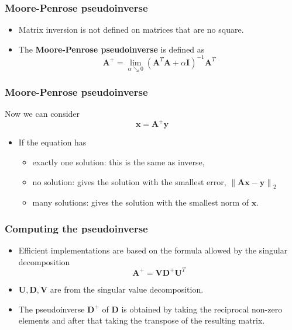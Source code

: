 \documentclass[notes]{beamer}          %
\newcommand{\vect}[1]{\bm{#1}}
\newcommand{\norm}[1]{\left\lVert#1\right\rVert}
\newcommand{\norm}[1]{\lVert#1\rVert}
\begin{document}
\begin{frame}
\frametitle{Moore-Penrose pseudoinverse}
    \begin{itemize}
        \item Matrix inversion is not defined on matrices that are no square.
        \item The {\bf Moore-Penrose pseudoinverse} is defined as
        $$
        \vect{A}^{+} = \lim_{\alpha \searrow 0}(\vect{A}^T\vect{A}+\alpha \vect{I})^{-1}\vect{A}^T
        $$

    \end{itemize}
\end{frame}

\begin{frame}
\frametitle{Moore-Penrose pseudoinverse}
    Now we can consider
    $$\vect{x} = \vect{A}^{+} \vect{y}$$
    \begin{itemize}
        \item If the equation has
            \begin{itemize}
                \item exactly one solution: this is the same as inverse,
                \item no solution: gives the solution with the smallest error, $\norm{\vect{A}\vect{x} - \vect{y}}_2$
                \item many solutions: gives the solution with the smallest norm of $\vect{x}$.
            \end{itemize}
    \end{itemize}

\end{frame}

\begin{frame}
\frametitle{Computing the pseudoinverse}
    \begin{itemize}
        \item Efficient implementations are based on the formula allowed by the singular decomposition
        $$
        \vect{A}^{+} = \vect{V}\vect{D}^{+}\vect{U}^T
        $$
        \item $\vect{U},\vect{D},\vect{V}$ are from the singular value decomposition.
        \item The pseudoinverse $\vect{D}^{+}$ of $\vect{D}$ is obtained by taking the reciprocal non-zero elements and after that taking the transpose of the resulting matrix.
    \end{itemize}

\end{frame}
\end{document}
